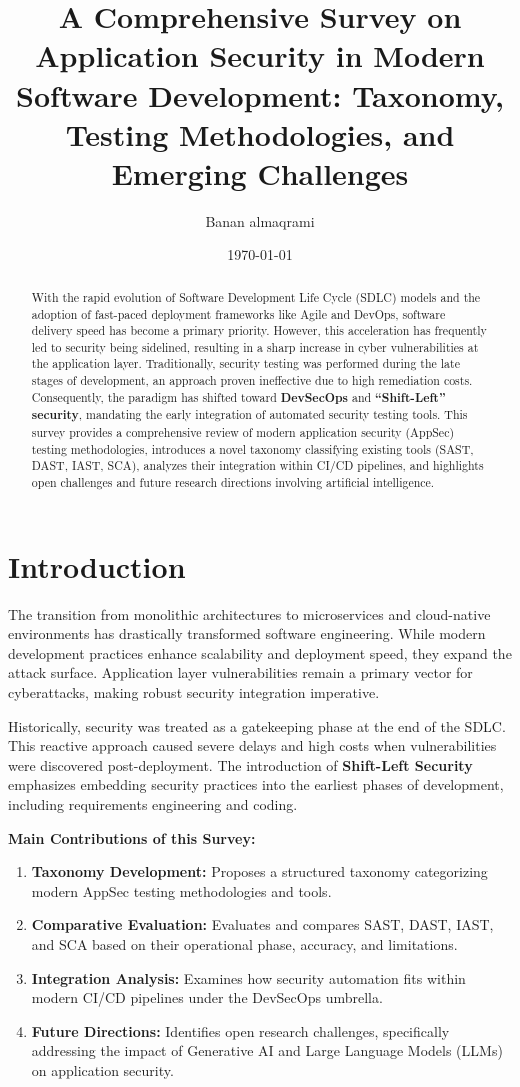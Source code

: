 \documentclass[11pt,a4paper]{article}
\title{A Comprehensive Survey on Application Security in Modern Software Development: Taxonomy, Testing Methodologies, and Emerging Challenges}
\author{Banan almaqrami}
\date{\today}
\begin{document}
\maketitle

\begin{abstract}
With the rapid evolution of Software Development Life Cycle (SDLC) models and the adoption of fast-paced deployment frameworks like Agile and DevOps, software delivery speed has become a primary priority. However, this acceleration has frequently led to security being sidelined, resulting in a sharp increase in cyber vulnerabilities at the application layer. Traditionally, security testing was performed during the late stages of development, an approach proven ineffective due to high remediation costs. Consequently, the paradigm has shifted toward \textbf{DevSecOps} and \textbf{``Shift-Left'' security}, mandating the early integration of automated security testing tools. This survey provides a comprehensive review of modern application security (AppSec) testing methodologies, introduces a novel taxonomy classifying existing tools (SAST, DAST, IAST, SCA), analyzes their integration within CI/CD pipelines, and highlights open challenges and future research directions involving artificial intelligence.
\end{abstract}

\section{Introduction}
The transition from monolithic architectures to microservices and cloud-native environments has drastically transformed software engineering. While modern development practices enhance scalability and deployment speed, they expand the attack surface. Application layer vulnerabilities remain a primary vector for cyberattacks, making robust security integration imperative.

Historically, security was treated as a gatekeeping phase at the end of the SDLC. This reactive approach caused severe delays and high costs when vulnerabilities were discovered post-deployment. The introduction of \textbf{Shift-Left Security} emphasizes embedding security practices into the earliest phases of development, including requirements engineering and coding.

\textbf{Main Contributions of this Survey:}
\begin{enumerate}
    \item \textbf{Taxonomy Development:} Proposes a structured taxonomy categorizing modern AppSec testing methodologies and tools.
    \item \textbf{Comparative Evaluation:} Evaluates and compares SAST, DAST, IAST, and SCA based on their operational phase, accuracy, and limitations.
    \item \textbf{Integration Analysis:} Examines how security automation fits within modern CI/CD pipelines under the DevSecOps umbrella.
    \item \textbf{Future Directions:} Identifies open research challenges, specifically addressing the impact of Generative AI and Large Language Models (LLMs) on application security.
\end{enumerate}
\end{document}
